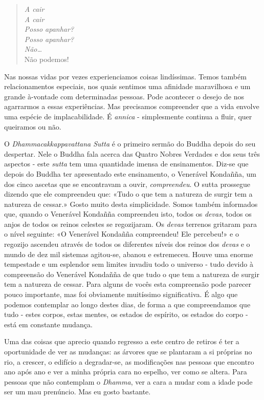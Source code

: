 \begin{quote}
  \emph{A cair}\\
  \emph{A cair}\\
  \emph{Posso apanhar?}\\
  \emph{Posso apanhar?}\\
  \emph{Não\ldots{}}\\
  Não podemos!
\end{quote}

Nas nossas vidas por vezes experienciamos coisas lindíssimas. Temos
também relacionamentos especiais, nos quais sentimos uma afinidade
maravilhosa e um grande à-vontade com determinadas pessoas. Pode
acontecer o desejo de nos agarrarmos a essas experiências. Mas
precisamos compreender que a vida envolve uma espécie de
implacabilidade. É \emph{annica} - simplesmente continua a fluir, quer
queiramos ou não.

O \emph{Dhammacakkappavattana Sutta} é o primeiro sermão do Buddha
depois do seu despertar. Nele o Buddha fala acerca das Quatro Nobres
Verdades e dos seus três aspectos - este \emph{sutta} tem uma quantidade
imensa de ensinamentos. Diz-se que depois do Buddha ter apresentado este
ensinamento, o Venerável Kondañña, um dos cinco ascetas que se
encontravam a ouvir, \emph{compreendeu}. O sutta prossegue dizendo que
ele compreendeu que: «Tudo o que tem a natureza de surgir tem a natureza
de cessar.» Gosto muito desta simplicidade. Somos também informados que,
quando o Venerável Kondañña compreendeu isto, todos os \emph{devas},
todos os anjos de todos os reinos celestes se regozijaram. Os
\emph{devas} terrenos gritaram para o nível seguinte: «O Venerável
Kondañña compreendeu! Ele percebeu!» e o regozijo ascendeu através de
todos os diferentes níveis dos reinos dos \emph{devas} e o mundo de dez
mil sistemas agitou-se, abanou e estremeceu. Houve uma enorme tempestade
e um esplendor sem limites invadiu todo o universo - tudo devido à
compreensão do Venerável Kondañña de que tudo o que tem a natureza de
surgir tem a natureza de cessar. Para alguns de vocês esta compreensão
pode parecer pouco importante, mas foi obviamente muitíssimo
significativa. É algo que podemos contemplar ao longo destes dias, de
forma a que compreendamos que tudo - estes corpos, estas mentes, os
estados de espírito, os estados do corpo - está em constante mudança.

Uma das coisas que aprecio quando regresso a este centro de retiros é
ter a oportunidade de ver as mudanças: as árvores que se plantaram a si
próprias no rio, a crescer, o edifício a degradar-se, as modificações
nas pessoas que encontro ano após ano e ver a minha própria cara no
espelho, ver como se altera. Para pessoas que não contemplam o
\emph{Dhamma}, ver a cara a mudar com a idade pode ser um mau prenúncio.
Mas eu gosto bastante.

